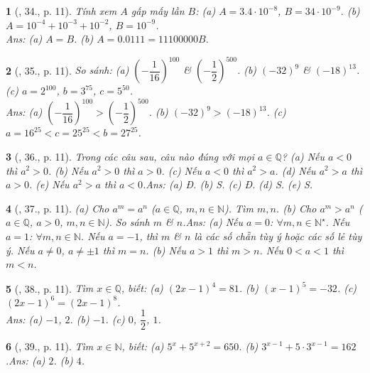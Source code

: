 \documentclass{article}
\newtheorem{baitoan}{}
\begin{document}
\begin{baitoan}[\cite{Binh_Toan_7_tap_1}, 34., p. 11]
	Tính xem $A$ gấp mấy lần $B$: (a) $A = 3.4\cdot 10^{-8}$, $B = 34\cdot 10^{-9}$. (b) $A = 10^{-4} + 10^{-3} + 10^{-2}$, $B = 10^{-9}$.\\\mbox{}\hfill{\sf Ans: (a) $A = B$. (b) $A = 0.0111 = 11 100 000B$.}
\end{baitoan}

\begin{baitoan}[\cite{Binh_Toan_7_tap_1}, 35., p. 11]
	So sánh: (a) $\left(-\dfrac{1}{16}\right)^{100}$ \& $\left(-\dfrac{1}{2}\right)^{500}$. (b) $(-32)^9$ \& $(-18)^{13}$. (c) $a = 2^{100}$, $b = 3^{75}$, $c = 5^{50}$.\\\mbox{}\hfill{\sf Ans: (a) $\left(-\dfrac{1}{16}\right)^{100} > \left(-\dfrac{1}{2}\right)^{500}$. (b) $(-32)^9 > (-18)^{13}$. (c) $a = 16^{25} < c = 25^{25} < b = 27^{25}$.}
\end{baitoan}

\begin{baitoan}[\cite{Binh_Toan_7_tap_1}, 36., p. 11]
	Trong các câu sau, câu nào đúng với mọi $a\in\mathbb{Q}$? (a) Nếu $a < 0$ thì $a^2 > 0$. (b) Nếu $a^2 > 0$ thì $a > 0$. (c) Nếu $a < 0$ thì $a^2 > a$. (d) Nếu $a^2 > a$ thì $a > 0$. (e) Nếu $a^2 > a$ thì $a < 0$.\hfill{\sf Ans: (a) Đ. (b) S. (c) Đ. (d) S. (e) S.}
\end{baitoan}

\begin{baitoan}[\cite{Binh_Toan_7_tap_1}, 37., p. 11]
	(a) Cho $a^m = a^n$ ($a\in\mathbb{Q}$, $m,n\in\mathbb{N}$). Tìm $m,n$. (b) Cho $a^m > a^n$ ($a\in\mathbb{Q}$, $a > 0$, $m,n\in\mathbb{N}$). So sánh $m$ \& $n$.\hfill{\sf Ans: (a) Nếu $a = 0$: $\forall m,n\in\mathbb{N}^\star$. Nếu $a = 1$: $\forall m,n\in\mathbb{N}$. Nếu $a = -1$, thì $m$ \& $n$ là các số chẵn tùy ý hoặc các số lẻ tùy ý. Nếu $a\ne 0$, $a\ne\pm 1$ thì $m = n$. (b) Nếu $a > 1$ thì $m > n$. Nếu $0 < a < 1$ thì $m < n$.}
\end{baitoan}

\begin{baitoan}[\cite{Binh_Toan_7_tap_1}, 38., p. 11]
	Tìm $x\in\mathbb{Q}$, biết: (a) $(2x - 1)^4 = 81$. (b) $(x - 1)^5 = -32$. (c) $(2x - 1)^6 = (2x - 1)^8$.\\\mbox{}\hfill{\sf Ans: (a) $-1$, $2$. (b) $-1$. (c) $0$, $\dfrac{1}{2}$, $1$.}
\end{baitoan}

\begin{baitoan}[\cite{Binh_Toan_7_tap_1}, 39., p. 11]
	Tìm $x\in\mathbb{N}$, biết: (a) $5^x + 5^{x+2} = 650$. (b) $3^{x-1} + 5\cdot 3^{x-1} = 162$.\hfill{\sf Ans: (a) $2$. (b) $4$.}
\end{baitoan}
\end{document}
